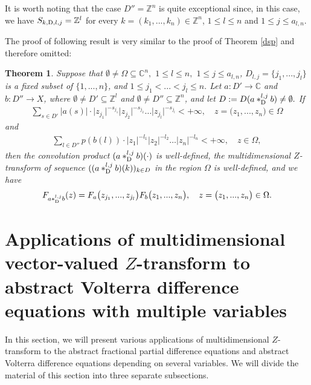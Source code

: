 \documentclass{amsart}
\newtheorem{thm}{Theorem}[section]
\theoremstyle{definition}
\theoremstyle{remark}
\numberwithin{equation}{section}
\begin{document}
It is worth noting that the case $D''={\mathbb Z}^{n}$ is quite exceptional since, in this case, we have $S_{k,{\rm D},l,j}={\mathbb Z}^{l}$ for every $k=(k_{1},...,k_{n}) \in {\mathbb Z}^{n}$, $1\leq l\leq n$ and $1\leq j\leq a_{l,n}.$ 

The proof of following result is very similar to the proof of Theorem \ref{dsp} and therefore omitted:

\begin{thm}\label{dsplj}
Suppose that $\emptyset \neq \Omega \subseteq {\mathbb C}^{n},$ $1\leq l\leq n,$ $1\leq j\leq a_{l,n}$, $D_{l,j}=\{j_{1},...,j_{l}\}$ is a fixed subset of $\{1,...,n\}$, and $1\leq j_{1}<...<j_{l}\leq n.$ Let $a:D' \rightarrow {\mathbb C}$ and $b: D'' \rightarrow X$, where $\emptyset \neq D' \subseteq {\mathbb Z}^{l}$ and $\emptyset \neq D'' \subseteq {\mathbb Z}^{n}$, and let $D:=
D (a \ast_{{\rm D}}^{l,j}b  )\neq \emptyset.$  If 
\begin{align}\label{pr1lj} 
\sum_{s\in D'}|a(s)| \cdot \bigl|z_{j_{1}}\bigr|^{-s_{j_{1}}}\bigl|z_{j_{2}}\bigr|^{-s_{j_{2}}}\ldots \bigl| z_{j_{l}}\bigr|^{-s_{j_{l}}}<+\infty,\quad z=\bigl(z_{1},...,z_{n}\bigr)\in \Omega 
\end{align} 
and
\begin{align}\label{pr2lj} 
\sum_{l\in D''}p(b(l)) \cdot
\bigl|z_{1}\bigr|^{-l_{1}}\bigl|z_{2}\bigr|^{-l_{2}}\ldots \bigl| z_{n}\bigr|^{-l_{n}}<+\infty ,\quad z\in \Omega ,
\end{align}
then the convolution product $(a\ast_{{\rm D}}^{l,j} b)(\cdot)$ is well-defined, the multidimensional $Z$-transform of sequence $((a\ast_{{\rm D}}^{l,j} b)(k))_{k\in D}$ in the region $\Omega$ is well-defined, and we have 
\begin{align}\label{psd1}
F_{a\ast_{{\rm D}}^{l,j} b}(z)=F_{a}\bigl(z_{j_{1}},...,z_{j_{l}} \bigr)F_{b}\bigl(z_{1},...,z_{n}\bigr), \quad z=\bigl(z_{1},...,z_{n}\bigr)\in \Omega.
\end{align} 
\end{thm}

\section{Applications of multidimensional vector-valued $Z$-transform to abstract Volterra difference equations with multiple variables}\label{sire}

In this section, we will present various applications of multidimensional $Z$-transform to the abstract fractional partial difference equations and abstract Volterra difference equations depending on several variables. We will divide the material of this section into three separate subsections.
\end{document}

